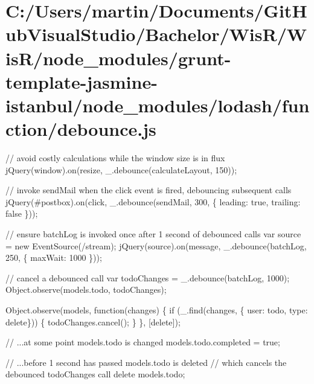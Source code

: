 \hypertarget{_c_1_2_users_2martin_2_documents_2_git_hub_visual_studio_2_bachelor_2_wis_r_2_wis_r_2node_module7dc90453c8994f73842a3b25e503aec3}{}\section{C\+:/\+Users/martin/\+Documents/\+Git\+Hub\+Visual\+Studio/\+Bachelor/\+Wis\+R/\+Wis\+R/node\+\_\+modules/grunt-\/template-\/jasmine-\/istanbul/node\+\_\+modules/lodash/function/debounce.\+js}
// avoid costly calculations while the window size is in flux j\+Query(window).on(\textquotesingle{}resize\textquotesingle{}, \+\_\+.\+debounce(calculate\+Layout, 150));

// invoke {\ttfamily send\+Mail} when the click event is fired, debouncing subsequent calls j\+Query(\textquotesingle{}\#postbox\textquotesingle{}).on(\textquotesingle{}click\textquotesingle{}, \+\_\+.\+debounce(send\+Mail, 300, \{ \textquotesingle{}leading\textquotesingle{}\+: true, \textquotesingle{}trailing\textquotesingle{}\+: false \}));

// ensure {\ttfamily batch\+Log} is invoked once after 1 second of debounced calls var source = new Event\+Source(\textquotesingle{}/stream\textquotesingle{}); j\+Query(source).on(\textquotesingle{}message\textquotesingle{}, \+\_\+.\+debounce(batch\+Log, 250, \{ \textquotesingle{}max\+Wait\textquotesingle{}\+: 1000 \}));

// cancel a debounced call var todo\+Changes = \+\_\+.\+debounce(batch\+Log, 1000); Object.\+observe(models.\+todo, todo\+Changes);

Object.\+observe(models, function(changes) \{ if (\+\_\+.\+find(changes, \{ \textquotesingle{}user\textquotesingle{}\+: \textquotesingle{}todo\textquotesingle{}, \textquotesingle{}type\textquotesingle{}\+: \textquotesingle{}delete\textquotesingle{}\})) \{ todo\+Changes.\+cancel(); \} \}, \mbox{[}\textquotesingle{}delete\textquotesingle{}\mbox{]});

// ...at some point {\ttfamily models.\+todo} is changed models.\+todo.\+completed = true;

// ...before 1 second has passed {\ttfamily models.\+todo} is deleted // which cancels the debounced {\ttfamily todo\+Changes} call delete models.\+todo;


